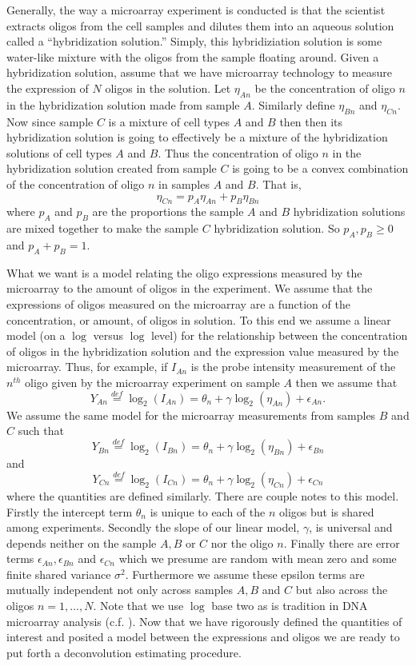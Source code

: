 \documentclass[reqno,12pt,oneside]{report}\usepackage[]{graphicx}\usepackage[]{color}
\theoremstyle{plain}
\theoremstyle{definition}
\theoremstyle{remark}
\numberwithin{theorem}{chapter}     %
\begin{document}
Generally, the way a microarray experiment is conducted is that the scientist extracts oligos from the cell samples and dilutes them into an aqueous solution called a ``hybridization solution.'' Simply, this hybridiziation solution is some water-like mixture with the oligos from the sample floating around. Given a hybridization solution, assume that we have microarray technology to measure the expression of $N$ oligos in the solution. Let $\eta_{An}$ be the concentration of oligo $n$ in the hybridization solution made from sample $A$. Similarly define $\eta_{Bn}$ and $\eta_{Cn}$. Now since sample $C$ is a mixture of cell types $A$ and $B$ then then its hybridization solution is going to effectively be a mixture of the hybridization solutions of cell types $A$ and $B$. Thus the concentration of oligo $n$ in the hybridization solution created from sample $C$ is going to be a convex combination of the concentration of oligo $n$ in samples $A$ and $B$. That is, 
\[
\eta_{Cn} = p_A\eta_{An} + p_B\eta_{Bn}
\]
where $p_A$ and $p_B$ are the proportions the sample $A$ and $B$ hybridization solutions are mixed together to make the sample $C$ hybridization solution. So $p_A,p_B\geq 0$ and $p_A+p_B = 1$. 

What we want is a model relating the oligo expressions measured by the microarray to the amount of oligos in the experiment. We assume that the expressions of oligos measured on the microarray are a function of the concentration, or amount, of oligos in solution. To this end we assume a linear model (on a $\log$ versus $\log$ level) for the relationship between the concentration of oligos in the hybridization solution and the expression value measured by the microarray. Thus, for example, if $I_{An}$ is the probe intensity measurement of the $n^{th}$ oligo given by the microarray experiment on sample $A$ then we assume that 
\[
Y_{An}\overset{def}{=}\log_2\left(I_{An}\right) = \theta_n + \gamma\log_2\left(\eta_{An}\right) + \epsilon_{An}.
\]
We assume the same model for the microarray measurements from samples $B$ and $C$ such that 
\[
Y_{Bn}\overset{def}{=}\log_2\left(I_{Bn}\right) = \theta_n + \gamma\log_2\left(\eta_{Bn}\right) + \epsilon_{Bn}
\]
and 
\[
Y_{Cn}\overset{def}{=}\log_2\left(I_{Cn}\right) = \theta_n + \gamma\log_2\left(\eta_{Cn}\right) + \epsilon_{Cn}
\]
where the quantities are defined similarly. There are couple notes to this model. Firstly the intercept term $\theta_n$ is unique to each of the $n$ oligos but is shared among experiments. Secondly the slope of our linear model, $\gamma$, is universal and depends neither on the sample $A,B$ or $C$ nor the oligo $n$. Finally there are error terms $\epsilon_{An},\epsilon_{Bn}$ and $\epsilon_{Cn}$ which we presume are random with mean zero and some finite shared variance $\sigma^2$. Furthermore we assume these epsilon terms are mutually independent not only across samples $A,B$ and $C$ but also across the oligos $n=1,\ldots,N$. Note that we use $\log$ base two as is tradition in DNA microarray analysis (c.f. \citeauthor{Irizarry2003} \citeyear{Irizarry2003}). Now that we have rigorously defined the quantities of interest and posited a model between the expressions and oligos we are ready to put forth a deconvolution estimating procedure. 
\end{document}
